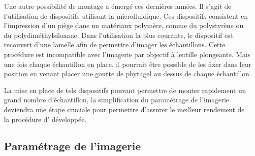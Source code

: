\documentclass[\main/main.tex]{subfiles}
\begin{document}
%
Une autre possibilité de montage a émergé  ces dernières années.
%
Il s'agit de l'utilisation de dispositifs utilisant la microfluidique\cite{khalili_2019}.
%
Ces dispositifs consistent en l'impression d'un piège dans un matériaux polymère, comme du polystyrène ou du polydiméthylsiloxane.
%
Dans l'utilisation la plus courante, le dispositif est recouvert d'une lamelle afin de permettre d'imager les échantillons.
%
Cette procédure est incompatible avec l'imagerie par objectif à lentille plongeante.
%
Mais une fois chaque échantillon en place,
il pourrait être possible de les fixer dans leur position en venant placer une goutte de phytagel au dessus de chaque échantillon.
%

La mise en place de tels dispositifs pouvant permettre de monter rapidement un grand nombre d'échantillon,
la simplification du paramétrage de l'imagerie deviendra une étape cruciale pour permettre d'assurer le meilleur rendement de la procédure d'\hti{} développée.

    \subsection{Paramétrage de l'imagerie}
\end{document}
